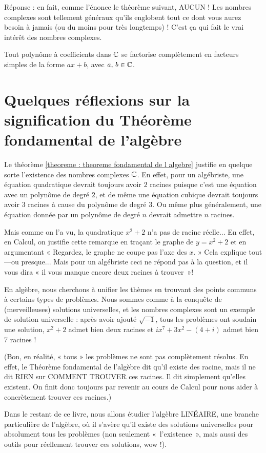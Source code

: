 Réponse : en fait, comme l'énonce le théorème suivant, AUCUN !  Les nombres complexes sont tellement généraux qu'ils englobent tout ce dont vous aurez besoin à jamais (ou du moins pour très longtemps) ! C'est ça qui fait le vrai intérêt des nombres complexes.

\begin{theorem}  \label{theoreme : theoreme fondamental de l algebre}
Tout polynôme à coefficients dans $\mathbb{C}$
se factorise complètement en facteurs simples de la forme $ax+b$,
avec $a,\, b \in \mathbb{C}$.
\end{theorem}

\section[Réflexions sur le Théorème fondamental de l'algèbre]{Quelques réflexions sur la signification du Théorème fondamental de l'algèbre}

Le théorème \ref{theoreme : theoreme fondamental de l algebre} justifie en quelque sorte l'existence des nombres complexes $\mathbb{C}$.
En effet, pour un algébriste, une équation quadratique devrait toujours avoir $2$ racines puisque c'est une équation avec un polynôme de degré $2$, et de même une équation cubique devrait toujours avoir $3$ racines à cause du polynôme de degré $3$. Ou même plus généralement, une équation donnée par un polynôme de degré $n$ devrait admettre $n$ racines.

Mais comme on l'a vu, la quadratique
$x^2+2$ n'a pas de racine réelle...
En effet, en Calcul,
on justifie cette remarque en tra\c{c}ant le graphe de $y=x^2+2$ et en argumentant
« Regardez, le graphe ne coupe pas l'axe des $x$. »  Cela explique tout---ou presque...
Mais pour un algébriste ceci ne répond pas à la question, et il vous dira  « il vous manque encore deux racines à trouver~»!

En algèbre, nous cherchons à unifier les thèmes en trouvant des points
communs à certains types de problèmes. Nous sommes comme à la conqu\^ete
de (merveilleuses) solutions universelles, et les nombres complexes sont
un exemple de solution universelle : après avoir ajouté $\sqrt{-1}$,
tous les problèmes ont soudain une solution, $x^2+2$ admet bien deux racines
et $ix^7+3x^2-(4+i)$ admet bien 7 racines !

(Bon, en réalité, « tous » les problèmes ne sont pas complètement résolus.
En effet, le Théorème fondamental de l'algèbre dit qu'il existe des racine, mais il ne dit RIEN sur COMMENT
TROUVER ces racines.  Il dit simplement qu'elles existent.  On finit donc toujours par
revenir au cours de Calcul pour nous aider à concrètement trouver ces racines.)

Dans le restant de ce livre, nous allons étudier l'algèbre LINÉAIRE,
une branche particulière de l'algèbre, où il s'avère qu'il existe
des solutions universelles pour absolument tous les problèmes
(non seulement «~l'existence~», mais aussi des outils pour réellement trouver ces solutions, wow !).






